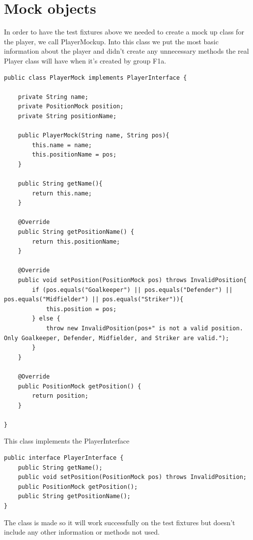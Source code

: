 \documentclass{article}
\begin{document}
\newpage
\section{Mock objects}
In order to have the test fixtures above we needed to create a mock up class for the player, we call PlayerMockup. Into this class we put the most basic information about the player and didn't create any unnecessary methods the real Player class will have when it's created by group F1a.

\begin{lstlisting}
public class PlayerMock implements PlayerInterface {

	private String name;
	private PositionMock position;
	private String positionName;
	
	public PlayerMock(String name, String pos){
		this.name = name;
		this.positionName = pos;
	}
	
	public String getName(){
		return this.name;
	}
	
	@Override
	public String getPositionName() {
		return this.positionName;
	}
	
	@Override
	public void setPosition(PositionMock pos) throws InvalidPosition{
		if (pos.equals("Goalkeeper") || pos.equals("Defender") || pos.equals("Midfielder") || pos.equals("Striker")){
			this.position = pos;
		} else {
			throw new InvalidPosition(pos+" is not a valid position. Only Goalkeeper, Defender, Midfielder, and Striker are valid.");
		}
	}
	
	@Override
	public PositionMock getPosition() {
		return position;
	}
	
}
\end{lstlisting}
This class implements the PlayerInterface
\begin{lstlisting}
public interface PlayerInterface {
	public String getName();
	public void setPosition(PositionMock pos) throws InvalidPosition;
	public PositionMock getPosition();
	public String getPositionName();
}
\end{lstlisting}
The class is made so it will work successfully on the test fixtures but doesn't include any other information or methods not used.
\end{document}

